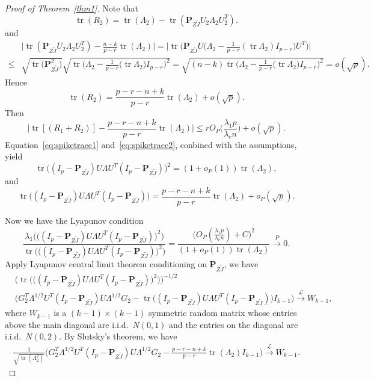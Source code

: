 \documentclass[12pt]{article} %
\DeclareMathOperator{\mytr}{tr}
\newcommand{\bP}{\mathbf{P}}
\theoremstyle{definition}
\begin{document}
\begin{proof}[\textrm{Proof of Theorem~\ref{thm1}}]
Note that
    $$
    \mytr(R_2)
    =
    \mytr(\Lambda_2)-\mytr(\bP_{Z\tilde{J}}U_2\Lambda_2 U_2^T).
    $$ 
and
    $$
    \begin{aligned}
        &
        \big|
    \mytr(\bP_{Z\tilde{J}}U_2\Lambda_2 U_2^T)
    -\frac{n-k}{p-r}\mytr(\Lambda_2)
    \big|
    =
    \big|
        \mytr\Big(\bP_{Z\tilde{J}} U \big(\Lambda_2-\frac{1}{p-r} (\mytr \Lambda_2) I_{p-r} \big) U^T\Big)
    \big|
        \\
        \leq &
        \sqrt{\mytr \big(\bP_{Z\tilde{J}}^2\big)}
        \sqrt{\mytr \Big(\Lambda_2-\frac{1}{p-r}\big(\mytr \Lambda_2\big) I_{p-r}\Big)^2}
        =\sqrt{(n-k)\mytr \Big(\Lambda_2-\frac{1}{p-r}\big(\mytr \Lambda_2\big) I_{p-r}\Big)^2}
        =o(\sqrt{p}).
    \end{aligned}
    $$
    Hence 
    $$
    \mytr(R_2)
    =
    \frac{p-r-n+k}{p-r}\mytr(\Lambda_2)+o(\sqrt{p}).
    $$
    Then
\begin{equation}\label{eq:spiketrace2}
\big| \mytr [(R_1+R_2)]-\frac{p-r-n+k}{p-r}\mytr(\Lambda_2)\big|\leq 
rO_P\big(\frac{\lambda_1 p}{\lambda_r n}\big)+o(\sqrt{p}).
\end{equation}
Equation~\eqref{eq:spiketrace1} and~\eqref{eq:spiketrace2}, conbined with the assumptions, yield
$$
    \mytr\big((I_p-\bP_{Z\tilde{J}})U\Lambda U^T (I_p-\bP_{Z\tilde{J}})\big)^2 
 =(1+o_P(1))\mytr(\Lambda_2),
$$
and
$$
\mytr\big((I_p-\bP_{Z\tilde{J}})U\Lambda U^T (I_p-\bP_{Z\tilde{J}})\big)
= \frac{p-r-n+k}{p-r}\mytr(\Lambda_2)+o_P(\sqrt{p}).
$$

Now we have the Lyapunov condition
$$
\frac{\lambda_1\Big(\big((I_p-\bP_{Z\tilde{J}})U\Lambda U^T (I_p-\bP_{Z\tilde{J}})\big)^2\Big)}{\mytr \Big( \big((I_p-\bP_{Z\tilde{J}})U\Lambda U^T (I_p-\bP_{Z\tilde{J}})\big)^2\Big)}
=
\frac{
\big( O_P(\frac{\lambda_1 p}{\lambda_r n})+C\big)^2
}{
    (1+o_P(1))\mytr(\Lambda_2)
}
\xrightarrow{P} 0.
$$
Apply Lyapunov central limit theorem conditioning on $\bP_{Z\tilde{J}}$, we have
$$
\begin{aligned}
    &\Big(\mytr \Big( \big((I_p-\bP_{Z\tilde{J}})U\Lambda U^T (I_p-\bP_{Z\tilde{J}})\big)^2\Big) \Big)^{-1/2}\\
    &\big( G_2^T \Lambda^{1/2}U^T (I_p-\bP_{Z\tilde{J}})U\Lambda^{1/2}G_2
    -\mytr\big((I_p-\bP_{Z\tilde{J}})U\Lambda U^T (I_p-\bP_{Z\tilde{J}})\big)
     I_{k-1} \big)
\xrightarrow{\mathcal{L}} W_{k-1},
\end{aligned}
$$
where $W_{k-1}$ is a $(k-1)\times(k-1)$ symmetric random matrix whose entries above the main diagonal are i.i.d.\ $N(0,1)$ and the entries on the diagonal are i.i.d.\ $N(0,2)$.
By Slutsky's theorem, we have
$$
\begin{aligned}
    \frac{1}{\sqrt{\mytr(\Lambda_2^2)}}
    \big( G_2^T \Lambda^{1/2}U^T (I_p-\bP_{Z\tilde{J}})U\Lambda^{1/2}G_2
    -\tfrac{p-r-n+k}{p-r}\mytr(\Lambda_2)I_{k-1} \big)
\xrightarrow{\mathcal{L}} W_{k-1}.
\end{aligned}
$$




\end{proof}
\end{document}
